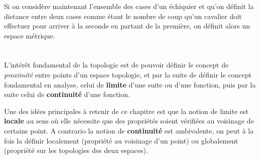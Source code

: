 \begin{center}
\end{center}

\subsection*{}
Si on considère maintenant l'ensemble des cases d'un échiquier et qu'on définit la distance entre deux cases comme étant le nombre de coup qu'un cavalier doit effectuer pour arriver à la seconde en partant de la première, on définit alors un espace métrique.

\chapter*{}
L'intérêt fondamental de la topologie est de pouvoir définir le concept de \textit{proximité} entre points d'un espace topologie, et par la suite de définir le concept fondamental en analyse, celui de \textbf{limite} d'une suite ou d'une fonction, puis par la suite celui de \textbf{continuité} d'une fonction.\<

Une des idées principales à retenir de ce chapitre est que la notion de limite est \textbf{locale} au sens où elle nécessite que des propriétés soient vérifiées au voisinage de certains point. A contrario la notion de \textbf{continuité} est ambivalente, on peut à la fois la définir localement (propriété au voisinage d'un point) ou globalement (propriété sur les topologies des deux espaces).\<


